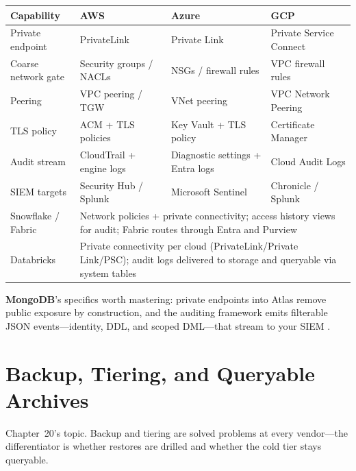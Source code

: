 \begin{center}
\footnotesize
\begin{tabular}{@{}p{2.9cm}p{3.0cm}p{3.0cm}p{3.0cm}@{}}
\toprule
\textbf{Capability} & \textbf{AWS} & \textbf{Azure} & \textbf{GCP} \\
\midrule
Private endpoint & PrivateLink & Private Link & Private Service Connect \\
Coarse network gate & Security groups / NACLs & NSGs / firewall rules & VPC firewall rules \\
Peering & VPC peering / TGW & VNet peering & VPC Network Peering \\
TLS policy & ACM + TLS policies & Key Vault + TLS policy & Certificate Manager \\
Audit stream & CloudTrail + engine logs & Diagnostic settings + Entra logs & Cloud Audit Logs \\
SIEM targets & Security Hub / Splunk & Microsoft Sentinel & Chronicle / Splunk \\
\addlinespace
Snowflake / Fabric & \multicolumn{3}{l}{Network policies + private connectivity; access history views for audit; Fabric routes through Entra and Purview} \\
Databricks & \multicolumn{3}{l}{Private connectivity per cloud (PrivateLink/Private Link/PSC); audit logs delivered to storage and queryable via system tables} \\
\bottomrule
\end{tabular}
\end{center}

\noindent \textbf{MongoDB}'s specifics worth mastering: private endpoints into Atlas remove public
exposure by construction, and the auditing framework emits filterable JSON events---identity, DDL,
and scoped DML---that stream to your SIEM \cite{mongodbPrivateLinkDocs,mongodbAuditingDocs}.

\section{Backup, Tiering, and Queryable Archives}
%
Chapter~20's topic. Backup and tiering are solved problems at every vendor---the differentiator
is whether restores are drilled and whether the cold tier stays queryable.

